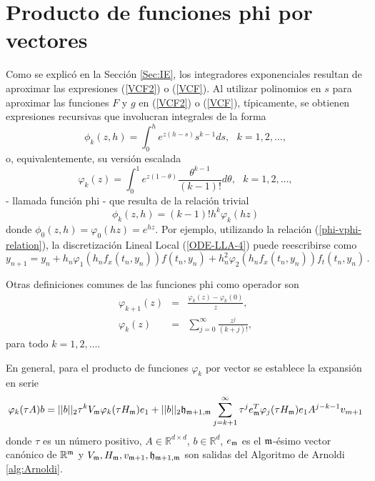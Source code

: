 \section{Producto de funciones phi por vectores}\label{section:phi-times-vector}

Como se explicó en la Sección \ref{Sec:IE}, los integradores exponenciales resultan de aproximar las expresiones (\ref{VCF2}) o (\ref{VCF}). Al utilizar polinomios en $s$ para aproximar las funciones $F$ y $g$ en (\ref{VCF2}) o (\ref{VCF}), típicamente, se obtienen expresiones recursivas que involucran integrales de la forma
\begin{equation*}
\phi _{k}(z,h)=\int_{0}^{h}e^{z(h-s)}s^{k-1}ds,\text{ \ \ \ \ \ \ \ }%
k=1,2,\ldots ,
\end{equation*}%
o, equivalentemente, su versión escalada
\begin{equation*}
\varphi _{k}(z)=\int_{0}^{1}e^{z(1-\theta )}\frac{\theta ^{k-1}}{(k-1)!}%
d\theta ,\text{ \ \ \ \ \ \ \ }k=1,2,\ldots ,
\end{equation*}%
- llamada función phi - que resulta de la relación trivial 
\begin{equation}
	\phi _{k}(z,h)=(k-1)!h^{k}\varphi_{k}(hz) \label{phi-vphi-relation}
\end{equation} 
donde $\phi _{0}(z,h)=\varphi _{0}(hz)=e^{hz}$. Por ejemplo, utilizando la relación (\ref{phi-vphi-relation}), la discretización Lineal Local (\ref{ODE-LLA-4})
puede reescribirse como
\begin{equation}
		y_{n+1}=y_{n}+h_n\varphi_1(h_nf_x(t_n,y_n))f(t_n,y_n) + h_n^2\varphi_2(h_nf_x(t_n,y_n))f_t(t_n,y_n)  \, . 
\end{equation}


Otras definiciones comunes de las funciones phi como operador son \cite{Saad92}
\begin{eqnarray}\label{phi-definition}
\varphi_{k+1}(z) &=& \frac{\varphi_k(z)-\varphi_k(0)}{z}, \label{DEF-PHI}\\
\varphi_k(z) & = &\sum\limits_{j=0}^{\infty}\frac{z^{j}}{(k+j)!}, \nonumber 
\end{eqnarray}
para todo $k=1,2,\ldots$.

En general, para el producto de funciones $\varphi_k$ por vector se establece la expansión en serie \cite{Saad92,sidje1998expokit}
\begin{equation} \label{PHI-EXPANSION}
	\varphi_k(\tau A)b=||b||_2\tau^{k} V_{\mathfrak{m}} \varphi_k(\tau H_{\mathfrak{m}})e_1 + ||b||_2\mathfrak{h}_{\mathfrak{m}+1,\mathfrak{m}}
	\sum_{j=k+1}^{\infty}\tau^{j} e_{\mathfrak{m}}^T\varphi_j(\tau H_{\mathfrak{m}})e_1A^{j-k-1}v_{m+1}
\end{equation}
donde $\tau$ es un número positivo, $A\in\mathbb{R}^{d\times d}$, $b\in\mathbb{R}^d$, $e_{\mathfrak{m}}$ es el $\mathfrak{m}$-ésimo vector canónico de $\mathbb{R}^{\mathfrak{m}}$ y $V_{\mathfrak{m}},H_{\mathfrak{m}},v_{\mathfrak{m}+1},\mathfrak{h}_{\mathfrak{m}+1,\mathfrak{m}}$ son salidas del Algoritmo de Arnoldi \ref{alg:Arnoldi}.

